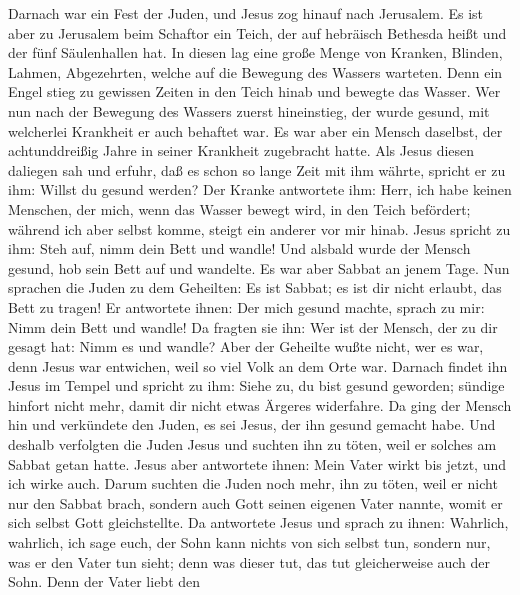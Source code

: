  Darnach war ein Fest der Juden, und Jesus zog hinauf nach
Jerusalem.  Es ist aber zu Jerusalem beim Schaftor ein
Teich, der auf hebräisch Bethesda heißt und der fünf Säulenhallen hat.
 In diesen lag eine große Menge von Kranken, Blinden,
Lahmen, Abgezehrten, welche auf die Bewegung des Wassers warteten.
 Denn ein Engel stieg zu gewissen Zeiten in den Teich
hinab und bewegte das Wasser. Wer nun nach der Bewegung des Wassers
zuerst hineinstieg, der wurde gesund, mit welcherlei Krankheit er auch
behaftet war.  Es war aber ein Mensch daselbst, der
achtunddreißig Jahre in seiner Krankheit zugebracht hatte.
 Als Jesus diesen daliegen sah und erfuhr, daß es schon so
lange Zeit mit ihm währte, spricht er zu ihm: Willst du gesund werden?
 Der Kranke antwortete ihm: Herr, ich habe keinen
Menschen, der mich, wenn das Wasser bewegt wird, in den Teich befördert;
während ich aber selbst komme, steigt ein anderer vor mir hinab.
 Jesus spricht zu ihm: Steh auf, nimm dein Bett und
wandle!  Und alsbald wurde der Mensch gesund, hob sein
Bett auf und wandelte. Es war aber Sabbat an jenem Tage. 
Nun sprachen die Juden zu dem Geheilten: Es ist Sabbat; es ist dir nicht
erlaubt, das Bett zu tragen!  Er antwortete ihnen: Der
mich gesund machte, sprach zu mir: Nimm dein Bett und wandle!
 Da fragten sie ihn: Wer ist der Mensch, der zu dir
gesagt hat: Nimm es und wandle?  Aber der Geheilte wußte
nicht, wer es war, denn Jesus war entwichen, weil so viel Volk an dem
Orte war.  Darnach findet ihn Jesus im Tempel und spricht
zu ihm: Siehe zu, du bist gesund geworden; sündige hinfort nicht mehr,
damit dir nicht etwas Ärgeres widerfahre.  Da ging der
Mensch hin und verkündete den Juden, es sei Jesus, der ihn gesund
gemacht habe.  Und deshalb verfolgten die Juden Jesus und
suchten ihn zu töten, weil er solches am Sabbat getan hatte.
 Jesus aber antwortete ihnen: Mein Vater wirkt bis jetzt,
und ich wirke auch.  Darum suchten die Juden noch mehr,
ihn zu töten, weil er nicht nur den Sabbat brach, sondern auch Gott
seinen eigenen Vater nannte, womit er sich selbst Gott gleichstellte.
 Da antwortete Jesus und sprach zu ihnen: Wahrlich,
wahrlich, ich sage euch, der Sohn kann nichts von sich selbst tun,
sondern nur, was er den Vater tun sieht; denn was dieser tut, das tut
gleicherweise auch der Sohn.  Denn der Vater liebt den

